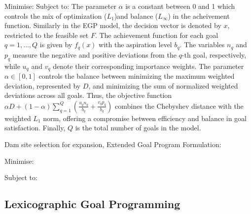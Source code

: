 Minimise:
            \EqEGPMinFunctionTen
Subject to:
            \EqGGPMinFunctionSubTwo
            \EqCGPConstraintSeven
            \EqCGPConstraintEight
            \EqGGPMinFunctionSubFour
            \EqCGPConstraintNine
The parameter $\alpha$ is a constant between 0 and 1 which controls the mix of optimization ($L_1$)and balance ($L_\infty$) in the acheivement function.
Similarly in the EGP model, the decision vector is denoted by $x$, restricted to the feasible set $F$. The achievement function for each goal $q=1,\dots,Q$ is given by $f_q(x)$ with the aspiration level $b_q$. The variables $n_q$ and $p_q$ measure the negative and positive deviations from the $q$-th goal, respectively, while $u_q$ and $v_q$ denote their corresponding importance weights. The parameter $\alpha \in [0,1]$ controls the balance between minimizing the maximum weighted deviation, represented by $D$, and minimizing the sum of normalized weighted deviations across all goals. 
Thus, the objective function $\alpha D + (1-\alpha)\sum_{q=1}^{Q}\left(\tfrac{u_q n_q}{b_q}+\tfrac{v_q p_q}{b_q}\right)$ combines the Chebyshev distance with the weighted $L_1$ norm, offering a compromise between efficiency and balance in goal satisfaction. Finally, $Q$ is the total number of goals in the model.


Dam site selection for expansion, Extended Goal Program Formulation:

Minimise:
        \EqEGPObjectiveThirtyThree

Subject to:
            \EqDamHeightConstraintTwelve
            \EqDamCapacityConstraintThirteen
            \EqReservoirAreaConstraintFourteen
            \EqTemperatureConstraintFifteen
            \EqPopulationConstraintSixteen
            \EqRainfallConstraintSeventeen
            \EqResidenceConstraintEighteen
            \EqFarmlandDistanceConstraintNineteen
            \EqNearestRoadConstraintTwenty
            \EqFarmlandAreaConstraintTwentyOne
            \EqSelectThreeDamsTwentyTwo
            \EqBudgetConstraintTwentyThree
            \EqDConstraintOneNTwentyFour
            \EqDConstraintTwoNTwentyFive
            \EqDConstraintThreeNTwentySix
            \EqDConstraintFourNTwentySix
            \EqDConstraintFiveNTwentySeven
            \EqDConstraintSixNTwentyEight
            \EqDConstraintSevenNTwentyNine
            \EqDConstraintEightNThirty
            \EqDConstraintNineNThirtyOne
            \EqDConstraintTenNThirtyTwo

\subsection{Lexicographic Goal Programming}


